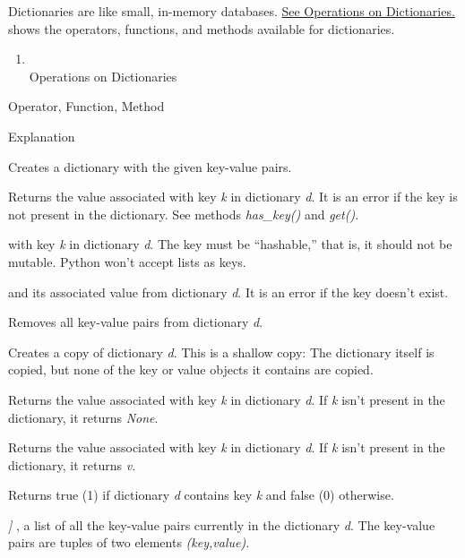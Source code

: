 Dictionaries are like small,
in-memory databases. \href{chap2.html\#13000}{See Operations on
Dictionaries.} shows the operators, functions, and methods available for
dictionaries.

\begin{enumerate}

\item
  \\
  Operations on Dictionaries
\end{enumerate}

Operator, Function, Method

Explanation



Creates a dictionary with the given
key-value pairs.



Returns the value associated with
key \emph{k} in dictionary \emph{d}. It is an error if the key is not
present in the dictionary. See methods \emph{has\_key()} and
\emph{get()}.



 with key
\emph{k} in dictionary \emph{d}. The key must be ``hashable,'' that is,
it should not be mutable. Python won't accept lists as keys.



 and its
associated value from dictionary \emph{d}. It is an error if the key
doesn't exist.



Removes all key-value pairs from
dictionary \emph{d}.



Creates a copy of dictionary
\emph{d}. This is a shallow copy: The dictionary itself is copied, but
none of the key or value objects it contains are copied.



Returns the value associated with
key \emph{k} in dictionary \emph{d}. If \emph{k} isn't present in the
dictionary, it returns \emph{None}.



Returns the value associated with
key \emph{k} in dictionary \emph{d}. If \emph{k} isn't present in the
dictionary, it returns \emph{v}.



Returns true (1) if dictionary
\emph{d} contains key \emph{k} and false (0) otherwise.




\emph{{]}} , a list of all the key-value pairs currently in the
dictionary \emph{d}. The key-value pairs are tuples of two elements
\emph{(key,value)}.



